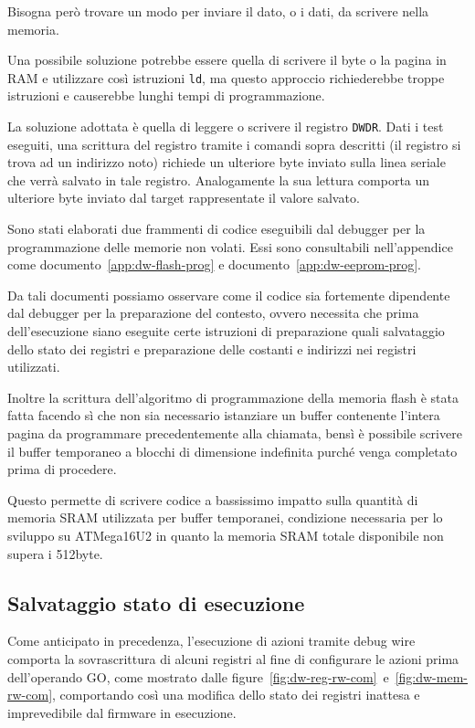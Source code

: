 Bisogna però trovare un modo per inviare il dato, o i dati, da scrivere nella memoria.

Una possibile soluzione potrebbe essere quella di scrivere il byte o la pagina in RAM e utilizzare così istruzioni \texttt{ld}, ma questo approccio richiederebbe troppe istruzioni e causerebbe lunghi tempi di programmazione.

La soluzione adottata è quella di leggere o scrivere il registro \texttt{DWDR}. Dati i test eseguiti, una scrittura del registro tramite i comandi sopra descritti (il registro si trova ad un indirizzo noto) richiede un ulteriore byte inviato sulla linea seriale che verrà salvato in tale registro\cite{site:dw-reverse-engeneering}. Analogamente la sua lettura comporta un ulteriore byte inviato dal target rappresentate il valore salvato\cite{site:dw-reverse-engeneering}.

Sono stati elaborati due frammenti di codice eseguibili dal debugger per la programmazione delle memorie non volati. Essi sono consultabili nell'appendice come documento~\ref{app:dw-flash-prog} e documento~\ref{app:dw-eeprom-prog}.

Da tali documenti possiamo osservare come il codice sia fortemente dipendente dal debugger per la preparazione del contesto, ovvero necessita che prima dell'esecuzione siano eseguite certe istruzioni di preparazione quali salvataggio dello stato dei registri e preparazione delle costanti e indirizzi nei registri utilizzati.

Inoltre la scrittura dell'algoritmo di programmazione della memoria flash è stata fatta facendo sì che non sia necessario istanziare un buffer contenente l'intera pagina da programmare precedentemente alla chiamata, bensì è possibile scrivere il buffer temporaneo a blocchi di dimensione indefinita purché venga completato prima di procedere.

Questo permette di scrivere codice a bassissimo impatto sulla quantità di memoria SRAM utilizzata per buffer temporanei, condizione necessaria per lo sviluppo su ATMega16U2 in quanto la memoria SRAM totale disponibile non supera i 512byte\cite{avr:m16u2}.

\subsection{Salvataggio stato di esecuzione}

Come anticipato in precedenza, l'esecuzione di azioni tramite debug wire comporta la sovrascrittura di alcuni registri al fine di configurare le azioni prima dell'operando GO, come mostrato dalle figure~\ref{fig:dw-reg-rw-com}~e~\ref{fig:dw-mem-rw-com}, comportando così una modifica dello stato dei registri inattesa e imprevedibile dal firmware in esecuzione.

